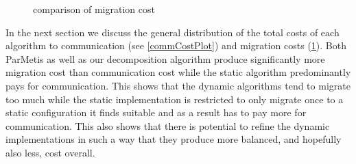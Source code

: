 \documentclass[a4paper,xcolor=dvipsnames, tikz, 12pt]{article}
\newcommand{\nl}{\newline}
\theoremstyle{definition}
\begin{document}
\begin{figure}
	\caption{comparison of migration cost}\label{migCostPlot}
\end{figure}


In the next section we discuss the general distribution of the total costs of each algorithm to communication (see \cref{commCostPlot}) and migration costs (\cref{migCostPlot}).\nl
Both ParMetis as well as our decomposition algorithm produce significantly more migration cost than communication cost while the static algorithm predominantly pays for communication. This shows that the dynamic algorithms tend to migrate too much while the static implementation is restricted to only migrate once to a static configuration it finds suitable and as a result has to pay more for communication. This also shows that there is potential to refine the dynamic implementations in such a way that they produce more balanced, and hopefully also less, cost overall.

\clearpage %

                             

	
\end{document}
